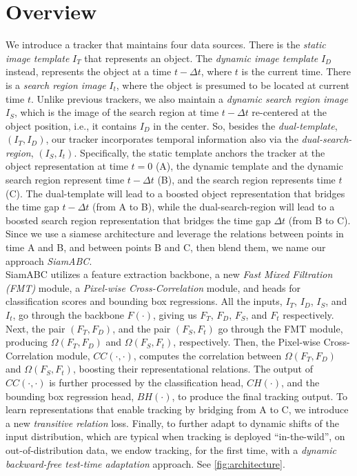 \section{Overview} 
We introduce a tracker that maintains four data sources. There is the \emph{static image template} $I_T$ that represents an object. The \emph{dynamic image template} $I_D$ instead, represents the object at a time $t - \Delta t$, where $t$ is the current time.
There is a \emph{search region image} $I_t$, where the object is presumed to be located at current time $t$. Unlike previous trackers, we also maintain a \emph{dynamic search region image} $I_{S}$, which is the image of the search region at time $t - \Delta t$ re-centered at the object position, i.e., it contains $I_D$ in the center. So, besides the \emph{dual-template}, $(I_T, I_D)$, our tracker incorporates temporal information also via the \emph{dual-search-region}, $(I_S, I_t)$. Specifically, the static template anchors the tracker at the object representation at time $t=0$ (A), the dynamic template and the dynamic search region represent time $t - \Delta t$ (B), and the search region represents time $t$ (C). The dual-template will lead to a boosted object representation that bridges the time gap $t - \Delta t$ (from A to B), while the dual-search-region will lead to a boosted search region representation that bridges the time gap $\Delta t$ (from B to C). Since we use a siamese architecture and leverage the relations between points in time A and B, and between points B and C, then blend them, we name our approach \emph{SiamABC}. \\

SiamABC utilizes a feature extraction backbone, a new \emph{Fast Mixed Filtration (FMT)} module, a \emph{Pixel-wise Cross-Correlation} module, and heads for classification scores and bounding box regressions. All the inputs, $I_T$, $I_D$, $I_{S}$, and $I_t$, go through the backbone $F(\cdot)$, giving us $F_T$, $F_D$, $F_S$, and $F_t$ respectively. Next, the pair $(F_T, F_D)$, and the pair $(F_S, F_t)$ go through the FMT module, producing $\Omega(F_T,F_D)$ and $\Omega(F_S,F_t)$, respectively.
Then, the Pixel-wise Cross-Correlation module, $CC(\cdot, \cdot)$, computes the correlation between $\Omega(F_T,F_D)$ and $\Omega(F_S,F_t)$, boosting their representational relations. The output of $CC(\cdot, \cdot)$ is further processed by the classification head, $CH(\cdot)$, and the bounding box regression head, $BH(\cdot)$, to produce the final tracking output. To learn representations that enable tracking by bridging from A to C, we introduce a new \emph{transitive relation} loss. Finally, to further adapt to dynamic shifts of the input distribution, which are typical when tracking is deployed ``in-the-wild'', on out-of-distribution data, we endow tracking, for the first time, with a \emph{dynamic backward-free test-time adaptation} approach. See \ref{fig:architecture}. 



